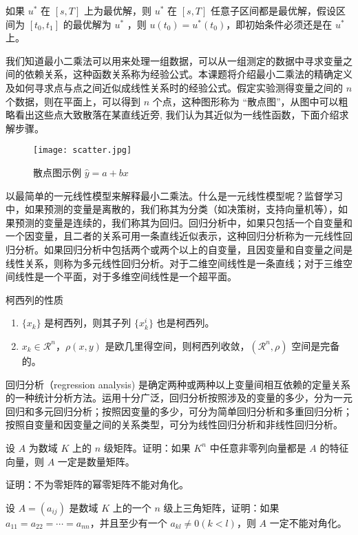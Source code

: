 \documentclass[cn,10pt,math=newtx,citestyle=gb7714-2015,bibstyle=gb7714-2015]{elegantbook}
\begin{document}
\begin{proposition}[最优性原理] \label{pro:max}
如果 $u^*$ 在 $[s,T]$ 上为最优解，则 $u^*$ 在 $[s, T]$ 任意子区间都是最优解，假设区间为 $[t_0, t_1]$ 的最优解为 $u^*$ ，则 $u(t_0)=u^{*}(t_0)$，即初始条件必须还是在 $u^*$ 上。
\end{proposition}

我们知道最小二乘法可以用来处理一组数据，可以从一组测定的数据中寻求变量之间的依赖关系，这种函数关系称为经验公式。本课题将介绍最小二乘法的精确定义及如何寻求点与点之间近似成线性关系时的经验公式。假定实验测得变量之间的 $n$ 个数据，则在平面上，可以得到 $n$ 个点，这种图形称为 “散点图”，从图中可以粗略看出这些点大致散落在某直线近旁, 我们认为其近似为一线性函数，下面介绍求解步骤。

\begin{figure}[htbp]
  \centering
  \texttt{[image: scatter.jpg]}
  \caption{散点图示例 $\hat{y}=a+bx$ \label{fig:scatter}}
\end{figure}

以最简单的一元线性模型来解释最小二乘法。什么是一元线性模型呢？监督学习中，如果预测的变量是离散的，我们称其为分类（如决策树，支持向量机等），如果预测的变量是连续的，我们称其为回归。回归分析中，如果只包括一个自变量和一个因变量，且二者的关系可用一条直线近似表示，这种回归分析称为一元线性回归分析。如果回归分析中包括两个或两个以上的自变量，且因变量和自变量之间是线性关系，则称为多元线性回归分析。对于二维空间线性是一条直线；对于三维空间线性是一个平面，对于多维空间线性是一个超平面。

\begin{property}\label{property:cauchy}
柯西列的性质
\begin{enumerate}
\item $\{x_k\}$ 是柯西列，则其子列 $\{x_k^i\}$ 也是柯西列。
\item $x_k\in \mathcal{R}^n$，$\rho(x,y)$ 是欧几里得空间，则柯西列收敛，$(\mathcal{R}^n,\rho)$ 空间是完备的。
\end{enumerate}
\end{property}

\begin{conclusion}
回归分析（regression analysis) 是确定两种或两种以上变量间相互依赖的定量关系的一种统计分析方法。运用十分广泛，回归分析按照涉及的变量的多少，分为一元回归和多元回归分析；按照因变量的多少，可分为简单回归分析和多重回归分析；按照自变量和因变量之间的关系类型，可分为线性回归分析和非线性回归分析。
\end{conclusion}

\begin{problemset}
\item 设 $A$ 为数域 $K$ 上的 $n$ 级矩阵。证明：如果 $K^n$ 中任意非零列向量都是 $A$ 的特征向量，则 $A$ 一定是数量矩阵。
\item 证明：不为零矩阵的幂零矩阵不能对角化。
\item 设 $A = (a_{ij})$ 是数域 $K$ 上的一个 $n$ 级上三角矩阵，证明：如果 $a_{11} = a_{22} = \cdots = a_{nn}$，并且至少有一个 $a_{kl} \not = 0 (k < l)$，则 $A$ 一定不能对角化。
\end{problemset}
\end{document}
